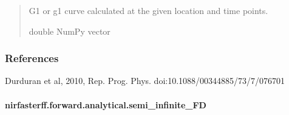\documentclass[letterpaper,10pt,english]{sphinxmanual}
\begin{document}
\begin{fulllineitems}
\begin{quote}
\begin{description}
\begin{itemize}
\end{itemize}

\sphinxAtStartPar
G1 or g1 curve calculated at the given location and time points.

\sphinxAtStartPar
double NumPy vector

\end{description}\end{quote}
\subsubsection*{References}

\sphinxAtStartPar
Durduran et al, 2010, Rep. Prog. Phys. doi:10.1088/0034\sphinxhyphen{}4885/73/7/076701

\end{fulllineitems}


\sphinxstepscope


\paragraph{nirfasterff.forward.analytical.semi\_infinite\_FD}
\label{\detokenize{_autosummary/nirfasterff.forward.analytical.semi_infinite_FD:nirfasterff-forward-analytical-semi-infinite-fd}}\label{\detokenize{_autosummary/nirfasterff.forward.analytical.semi_infinite_FD::doc}}
\end{document}
